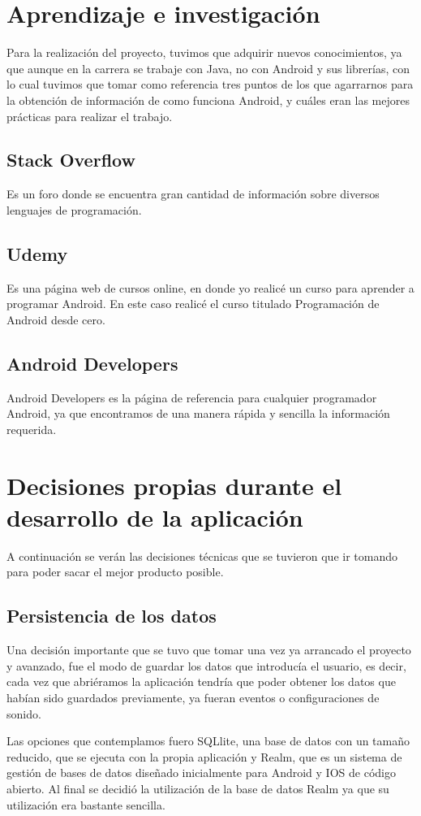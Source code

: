 \section{Aprendizaje e investigación}
Para la realización del proyecto, tuvimos que adquirir nuevos conocimientos, ya que aunque en la carrera se trabaje con Java, no con Android y sus librerías, con lo cual tuvimos que tomar como referencia tres puntos de los que agarrarnos para la obtención de información de como funciona Android, y cuáles eran las mejores prácticas para realizar el trabajo.
\subsection{Stack Overflow}
Es un foro donde se encuentra gran cantidad de información sobre diversos lenguajes de programación.\cite{stackoverflow}
\subsection{Udemy}
Es una página web de cursos online, en donde yo realicé un curso para aprender a programar Android. En este caso realicé el curso titulado Programación de Android desde cero. \cite{udemy}
\subsection{Android Developers}
Android Developers es la página de referencia para cualquier programador Android, ya que encontramos de una manera rápida y sencilla la información requerida.\cite{developers}

\section{Decisiones propias durante el desarrollo de la aplicación}
A continuación se verán las decisiones técnicas que se tuvieron que ir tomando para poder sacar el mejor producto posible.

\subsection{Persistencia de los datos}
Una decisión importante que se tuvo que tomar una vez ya arrancado el proyecto y avanzado, fue el modo de guardar los datos que introducía el usuario, es decir, cada vez que abriéramos la aplicación tendría que poder obtener los datos que habían sido guardados previamente, ya fueran eventos o configuraciones de sonido.

Las opciones que contemplamos fuero SQLlite, una base de datos con un tamaño reducido, que se ejecuta con la propia aplicación y Realm, que es un sistema de gestión de bases de datos diseñado inicialmente para Android y IOS de código abierto.
Al final se decidió la utilización de la base de datos Realm ya que su utilización era bastante sencilla.

